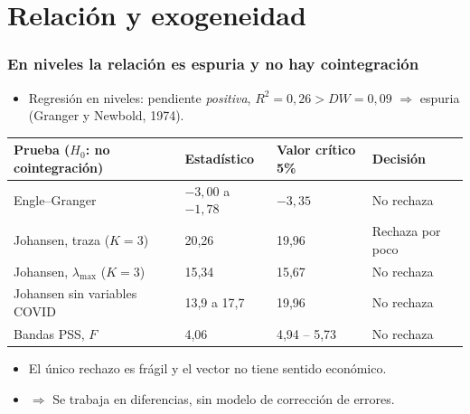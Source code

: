 \documentclass[aspectratio=169]{beamer}
\begin{document}
\section{Relación y exogeneidad}
\begin{frame}
  \frametitle{En niveles la relación es espuria y no hay cointegración}
  \begin{itemize}
    \item Regresión en niveles: pendiente \emph{positiva}, $R^2=0{,}26>DW=0{,}09$ $\Rightarrow$ espuria (Granger y Newbold, 1974).
  \end{itemize}
  \centering\small
  \begin{tabular}{llll}
    \toprule
    Prueba ($H_0$: no cointegración) & Estadístico & Valor crítico 5\% & Decisión \\
    \midrule
    Engle--Granger & $-3{,}00$ a $-1{,}78$ & $-3{,}35$ & No rechaza \\
    Johansen, traza ($K=3$) & 20,26 & 19,96 & Rechaza por poco \\
    Johansen, $\lambda_{\max}$ ($K=3$) & 15,34 & 15,67 & No rechaza \\
    Johansen sin variables COVID & 13,9 a 17,7 & 19,96 & No rechaza \\
    Bandas PSS, $F$ & 4,06 & 4,94 -- 5,73 & No rechaza \\
    \bottomrule
  \end{tabular}

  \raggedright
  \begin{itemize}
    \item El único rechazo es frágil y el vector no tiene sentido económico.
    \item $\Rightarrow$ \alert{Se trabaja en diferencias, sin modelo de corrección de errores.}
  \end{itemize}
\end{frame}
\end{document}
